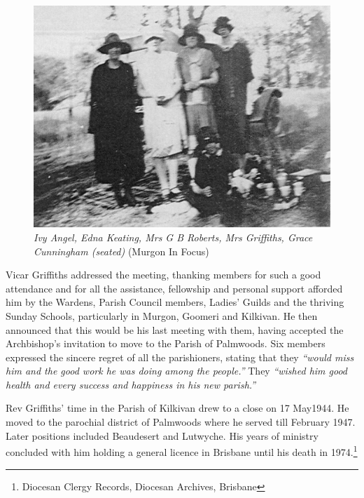 \begin{figure}[htb]
\begin{center}
\includegraphics[width=1.\textwidth,center]{../images/mrsGriffiths.jpg}
\caption{{\itshape Ivy Angel, Edna Keating, Mrs G B Roberts, Mrs Griffiths, Grace Cunningham (seated)} {\scriptsize(Murgon In Focus)}}
\end{center}
\end{figure}




Vicar Griffiths addressed the meeting, thanking members for such a good attendance and for all the assistance, fellowship and personal support afforded him by the Wardens, Parish Council members, Ladies' Guilds and the thriving Sunday Schools, particularly in Murgon, Goomeri and Kilkivan. He then announced that this would be his last meeting with them, having accepted the Archbishop's invitation to move to the Parish of Palmwoods. Six members expressed the sincere regret of all the parishioners, stating that they \emph{``would miss him and the good work he was doing among the people.''} They \emph{``wished him good health and every success and happiness in his new parish.''}



Rev Griffiths' time in the Parish of Kilkivan drew to a close on 17 May1944. He moved to the parochial district of Palmwoods where he served till February 1947. Later positions included Beaudesert and Lutwyche. His years of ministry concluded with him holding a general licence in Brisbane until his death in 1974.\footnote{Diocesan Clergy Records, Diocesan Archives, Brisbane}


